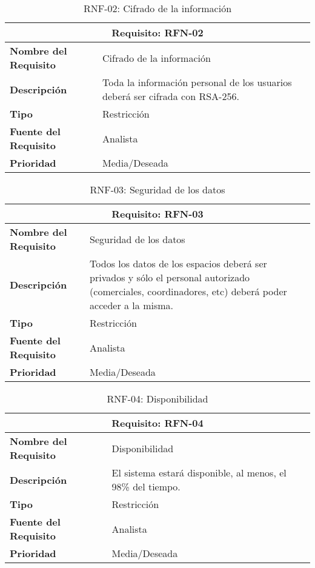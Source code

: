 \begin{table}[H]
\begin{center}
\begin{tabular}{p{} p{7cm}}
\multicolumn{2}{c}{\textbf{Requisito: RFN-02} } \\
\hline \hline
\textbf{Nombre del Requisito} & Cifrado de la información  \\
\hline
\textbf{Descripción} & Toda la información personal de los usuarios deberá ser cifrada con RSA-256.\\
\hline
\textbf{Tipo} & Restricción \\
\hline
\textbf{Fuente del Requisito} &  Analista \\
\hline
\textbf{Prioridad} &  Media/Deseada \\ \hline
\end{tabular}
\caption{RNF-02: Cifrado de la información}
\label{tab:RFN-02}
\end{center}
\end{table}

\begin{table}[H]
\begin{center}
\begin{tabular}{p{} p{7cm}}
\multicolumn{2}{c}{\textbf{Requisito: RFN-03} } \\
\hline \hline
\textbf{Nombre del Requisito} & Seguridad de los datos  \\
\hline
\textbf{Descripción} & Todos los datos de los espacios deberá ser privados y sólo el personal autorizado (comerciales, coordinadores, etc) deberá poder acceder a la misma. \\
\hline
\textbf{Tipo} & Restricción \\
\hline
\textbf{Fuente del Requisito} &  Analista \\
\hline
\textbf{Prioridad} &  Media/Deseada \\ \hline
\end{tabular}
\caption{RNF-03: Seguridad de los datos}
\label{tab:RFN-03}
\end{center}
\end{table}

\begin{table}[H]
\begin{center}
\begin{tabular}{p{} p{7cm}}
\multicolumn{2}{c}{\textbf{Requisito: RFN-04} } \\
\hline \hline
\textbf{Nombre del Requisito} & Disponibilidad  \\
\hline
\textbf{Descripción} & El sistema estará disponible, al menos, el 98\% del tiempo. \\
\hline
\textbf{Tipo} & Restricción \\
\hline
\textbf{Fuente del Requisito} &  Analista \\
\hline
\textbf{Prioridad} &  Media/Deseada \\ \hline
\end{tabular}
\caption{RNF-04: Disponibilidad}
\label{tab:RFN-04}
\end{center}
\end{table}

